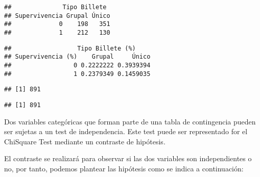 \documentclass[
]{article}
\newenvironment{Shaded}{\begin{snugshade}}{\end{snugshade}}
\newcommand{\CommentTok}[1]{\textcolor[rgb]{0.50,0.62,0.50}{#1}}
\newcommand{\DataTypeTok}[1]{\textcolor[rgb]{0.87,0.87,0.75}{#1}}
\newcommand{\KeywordTok}[1]{\textcolor[rgb]{0.94,0.87,0.69}{#1}}
\newcommand{\NormalTok}[1]{\textcolor[rgb]{0.80,0.80,0.80}{#1}}
\newcommand{\OperatorTok}[1]{\textcolor[rgb]{0.94,0.94,0.82}{#1}}
\newcommand{\StringTok}[1]{\textcolor[rgb]{0.80,0.58,0.58}{#1}}
\begin{document}
\begin{verbatim}
##              Tipo Billete
## Supervivencia Grupal Único
##             0    198   351
##             1    212   130
\end{verbatim}

\begin{Shaded}
\end{Shaded}

\begin{verbatim}
##                  Tipo Billete (%)
## Supervivencia (%)    Grupal     Único
##                 0 0.2222222 0.3939394
##                 1 0.2379349 0.1459035
\end{verbatim}

\begin{Shaded}
\end{Shaded}

\begin{verbatim}
## [1] 891
\end{verbatim}

\begin{Shaded}
\end{Shaded}

\begin{verbatim}
## [1] 891
\end{verbatim}

Dos variables categóricas que forman parte de una tabla de contingencia
pueden ser sujetas a un test de independencia. Este test puede ser
representado for el ChiSquare Test mediante un contraste de hipótesis.

El contraste se realizará para observar si las dos variables son
independientes o no, por tanto, podemos plantear las hipótesis como se
indica a continuación:
\end{document}
